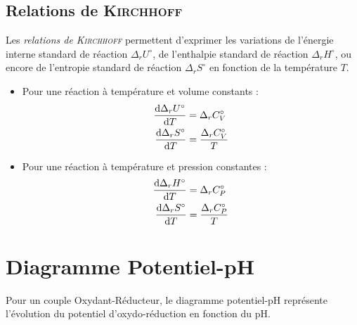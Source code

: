 \documentclass[11pt,a4paper,fleqn,pdftex]{report}
\begin{document}
\section{Relations de \textsc{Kirchhoff}} %
\label{sec:relations_de_kirchhoff}
\needspace{7cm}
\begin{theorem}
   Les \emph{relations de \textsc{Kirchhoff}} permettent d'exprimer les variations de l'énergie interne standard de réaction $\Delta_r U^\circ$, de l'enthalpie standard de réaction $\Delta_r H^\circ$, ou encore de l'entropie standard de réaction $\Delta_r S^\circ$ en fonction de la température $T$. 

\begin{itemize}[leftmargin=5.5mm]
  \item Pour une réaction à température et volume constants :
        \begin{subequations}
           \begin{align}
              \dfrac{\mathrm{d} \Delta_r U^\circ}{\mathrm{d} T} &= \Delta_r C_V^\circ \\
              \dfrac{\mathrm{d} \Delta_r S^\circ}{\mathrm{d} T} &= \dfrac{\Delta_r C_V^\circ}{T}
           \end{align}
        \end{subequations}
  \item Pour une réaction à température et pression constantes :
        \begin{subequations}
           \begin{align}
              \dfrac{\mathrm{d} \Delta_r H^\circ}{\mathrm{d} T} &= \Delta_r C_P^\circ \\
              \dfrac{\mathrm{d} \Delta_r S^\circ}{\mathrm{d} T} &= \dfrac{\Delta_r C_P^\circ}{T}
           \end{align}
        \end{subequations}
\end{itemize}

\end{theorem}
\chapter{Diagramme Potentiel-pH}
Pour un couple Oxydant-Réducteur, le diagramme potentiel-pH représente l'évolution du potentiel d'oxydo-réduction en fonction du pH. 
\end{document}

